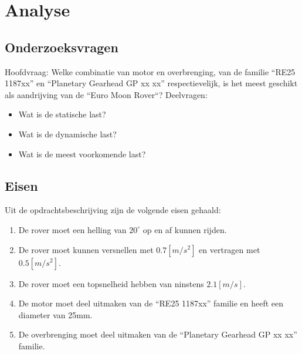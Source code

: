 \documentclass{article}
\begin{document}
    \section{Analyse}
        \subsection{Onderzoeksvragen}
            Hoofdvraag: \newline
            Welke combinatie van motor en overbrenging, 
            van de familie ``RE25 1187xx'' en ``Planetary Gearhead GP xx xx'' respectievelijk, 
            is het meest geschikt als aandrijving van de ``Euro Moon Rover``?
            \newline \newline
            Deelvragen: 
            \begin{itemize}
                \item Wat is de statische last?
                \item Wat is de dynamische last?
                \item Wat is de meest voorkomende last?
            \end{itemize}

        \subsection{Eisen}
            Uit de opdrachtsbeschrijving zijn de volgende eisen gehaald:
            \begin{enumerate}
                \item De rover moet een helling van $20^{\circ}$ op en af kunnen rijden.
                \item De rover moet kunnen versnellen met $0.7[m/s^2]$ en vertragen met $0.5[m/s^2]$.
                \item De rover moet een topsnelheid hebben van ninstens $2.1[m/s]$.
                \item De motor moet deel uitmaken van de ``RE25 1187xx'' familie en heeft een diameter van 25mm.
                \item De overbrenging moet deel uitmaken van de ``Planetary Gearhead GP xx xx'' familie.
            \end{enumerate}
        
\end{document}
